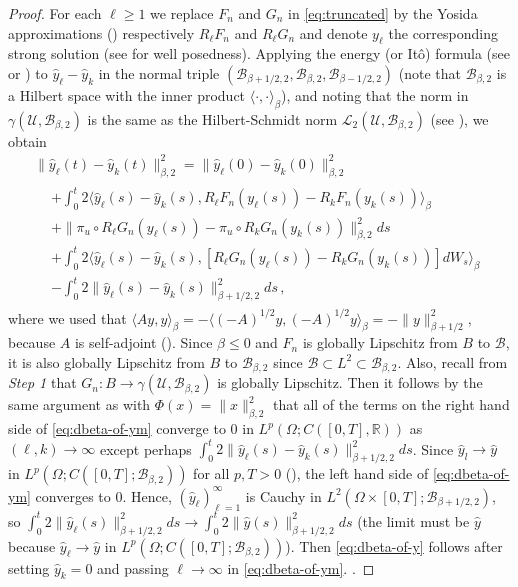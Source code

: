 \documentclass[final]{amsart}
\numberwithin{thm}{section}
\numberwithin{equation}{section}
\newcommand{\U}{\mathcal{U}}
\newcommand{\R}{\mathbb{R}}
\newcommand{\ip}[2]{\langle #1, #2 \rangle}
\newcommand{\B}{\mathcal{B}}
\begin{document}
\begin{proof}
    For each $\ell \geq 1$ we replace $F_n$ and $G_n$ in \eqref{eq:truncated} by the Yosida approximations () respectively $R_\ell F_n$
    and $R_\ell G_n$ and denote $y_\ell$ the corresponding strong solution 
    (see  for well posedness). 
    Applying the energy (or It\^o) formula (see \cite[Theorem 4.2.5]{liu-rockner} or \cite[Theorem 3.3.15]{SPDE-book}) to $\hat y_\ell - \hat y_k$ in the normal triple $(\B_{\beta+1/2,2}, \B_{\beta,2}, \B_{\beta-1/2,2})$ (note that $\B_{\beta,2}$ is a Hilbert space with the inner product $\ip{\cdot}{\cdot}_\beta$), and noting 
    that the norm in $\gamma(\U, \B_{\beta,2})$ is the same as the Hilbert-Schmidt norm $\mathcal{L}_2(\U, \B_{\beta,2})$ (see \cite[Proposition 13.5]{radonifying-survey}), we obtain
    \begin{multline}\label{eq:dbeta-of-ym}
    \|\hat y_\ell(t) - \hat y_k(t)\|_{\beta,2}^2 = \|\hat y_\ell(0) - \hat y_k(0)\|_{\beta,2}^2 \\
    \begin{aligned}
         &+ \int_0^t 2\ip{\hat y_\ell(s) - \hat y_k(s)}{R_\ell F_n(y_\ell(s)) - R_kF_n(y_k(s))}_\beta \\
         &+ \|\pi_u\circ R_\ell G_n(y_\ell(s)) - \pi_u \circ R_kG_n(y_k(s))\|_{\beta,2}^2 ds \\
         &+ \int_0^t 2\ip{\hat y_\ell(s) - \hat y_k(s)}{ [R_\ell G_n(y_\ell(s)) - R_kG_n(y_k(s))]dW_s}_\beta \\
         &- \int_0^t 2\|\hat y_\ell(s) - \hat y_k(s)\|_{\beta+1/2,2}^2ds \,,
    \end{aligned}
    \end{multline}
where we used that $\ip{Ay}{y}_\beta = -\ip{(-A)^{1/2}y}{(-A)^{1/2}y}_\beta = -\|y\|_{\beta+1/2}^2$, because $A$ is self-adjoint (). Since $\beta \leq 0$ and $F_n$ is globally Lipschitz from $B$ to $\B$, it is also globally Lipschitz from $B$ to $\B_{\beta,2}$ since $\B \subset L^2 \subset \B_{\beta,2}$. Also, recall from \textit{Step 1} that $G_n: B \to \gamma(\U, \B_{\beta,2})$ is globally Lipschitz. Then it 
follows by the same argument as  with $\Phi(x) = \|x\|_{\beta,2}^2$
 that all of the terms on the right hand side of \eqref{eq:dbeta-of-ym} converge to $0$ in $L^p(\Omega; C([0,T],\R))$ as $(\ell,k) \to \infty$ except perhaps $\int_0^t 2\|\hat y_\ell(s) - \hat y_k(s)\|_{\beta+1/2,2}^2ds$. Since $\hat y_l \to \hat y$ in $L^p(\Omega; C([0,T];\B_{\beta,2}))$ for all $p,T > 0$ (), the left hand side of \eqref{eq:dbeta-of-ym} converges to $0$.  Hence, $(\hat y_\ell)_{\ell = 1}^\infty$ is Cauchy in $L^2(\Omega \times [0,T]; \B_{\beta+1/2,2})$, so $\int_0^t 2\|\hat y_\ell(s)\|_{\beta+1/2,2}^2ds \to \int_0^t 2\|\hat y(s)\|_{\beta+1/2,2}^2ds$ (the limit must be $\hat y$ because $\hat y_{\ell} \to \hat y$ in $L^p(\Omega; C([0,T];\B_{\beta,2}))$).
 Then \eqref{eq:dbeta-of-y} follows 
 after setting $\hat{y}_k = 0$ and passing $\ell \to \infty$
 in \eqref{eq:dbeta-of-ym}.
  . 


\end{proof}
\end{document}
